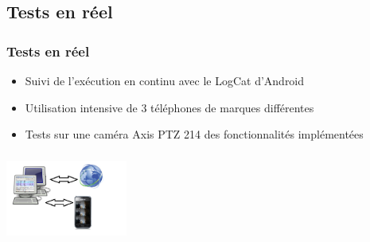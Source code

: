 \subsection{Tests en réel}
 \begin{frame}
\begin{minipage}{0.59\textwidth}
   \frametitle{Tests en réel}
\begin{itemize}
    \item Suivi de l'exécution en continu avec le LogCat d'Android
    \item Utilisation intensive de 3 téléphones de marques différentes
    \item Tests sur une caméra Axis PTZ 214 des fonctionnalités implémentées
   \end{itemize}
\end{minipage}
\begin{minipage}{0.39\textwidth}
 \includegraphics[width=4cm, height=3cm]{Images/ImageSlide13.png}
\end{minipage}
\end{frame}